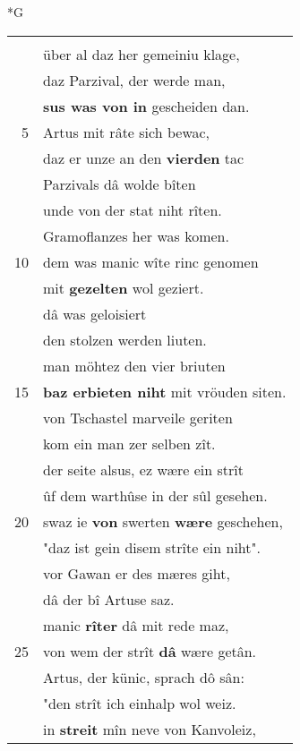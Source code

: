 \documentclass[8pt,a4paper,notitlepage]{article}
\begin{document}
\newpage
\begin{table}[ht]
\begin{minipage}[t]{0.5\linewidth}
\small
\begin{center}*G
\end{center}
\begin{tabular}{rl}
 & \textbf{\begin{large}D\end{large}ô} was bî dem selben tage\\ 
 & über al daz her gemeiniu klage,\\ 
 & daz Parzival, der werde man,\\ 
 & \textbf{sus was von in} gescheiden dan.\\ 
5 & Artus mit râte sich bewac,\\ 
 & daz er unze an den \textbf{vierden} tac\\ 
 & Parzivals dâ wolde bîten\\ 
 & unde von der stat niht rîten.\\ 
 & Gramoflanzes her was komen.\\ 
10 & dem was manic wîte rinc genomen\\ 
 & mit \textbf{gezelten} wol geziert.\\ 
 & dâ was geloisiert\\ 
 & den stolzen werden liuten.\\ 
 & man möhtez den vier briuten\\ 
15 & \textbf{baz erbieten niht} mit vröuden siten.\\ 
 & von Tschastel marveile geriten\\ 
 & kom ein man zer selben zît.\\ 
 & der seite alsus, ez wære ein strît\\ 
 & ûf dem warthûse in der sûl gesehen.\\ 
20 & swaz ie \textbf{von} swerten \textbf{wære} geschehen,\\ 
 & "daz ist gein disem strîte ein niht".\\ 
 & vor Gawan er des mæres giht,\\ 
 & dâ der bî Artuse saz.\\ 
 & manic \textbf{rîter} dâ mit rede maz,\\ 
25 & von wem der strît \textbf{dâ} wære getân.\\ 
 & Artus, der künic, sprach dô sân:\\ 
 & "den strît ich einhalp wol weiz.\\ 
 & in \textbf{streit} mîn neve von Kanvoleiz,\\ 

\end{tabular}
\end{minipage}
\end{table}
\end{document}
